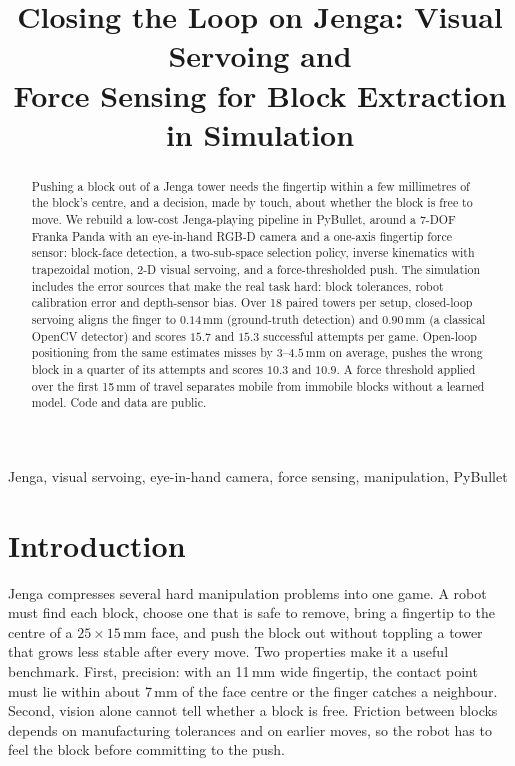 \documentclass[conference]{IEEEtran}
\begin{document}
\title{Closing the Loop on Jenga: Visual Servoing and\\Force Sensing for Block Extraction in Simulation}

\author{
}

\maketitle

\begin{abstract}
Pushing a block out of a Jenga tower needs the fingertip within a few millimetres
of the block's centre, and a decision, made by touch, about whether the block is
free to move. We rebuild a low-cost Jenga-playing pipeline in PyBullet, around a
7-DOF Franka Panda with an eye-in-hand RGB-D camera and a one-axis fingertip force
sensor: block-face detection, a two-sub-space selection policy, inverse kinematics
with trapezoidal motion, 2\textonehalf-D visual servoing, and a force-thresholded
push. The simulation includes the error sources that make the real task hard:
block tolerances, robot calibration error and depth-sensor bias. Over 18 paired
towers per setup, closed-loop servoing aligns the finger to $0.14$\,mm (ground-truth
detection) and $0.90$\,mm (a classical OpenCV detector) and scores $15.7$ and $15.3$
successful attempts per game. Open-loop positioning from the same estimates misses by
$3$--$4.5$\,mm on average, pushes the wrong block in a quarter of its attempts and scores
$10.3$ and $10.9$. A force threshold applied over the first 15\,mm of travel separates
mobile from immobile blocks without a learned model. Code and data are public.
\end{abstract}

\begin{IEEEkeywords}
Jenga, visual servoing, eye-in-hand camera, force sensing, manipulation, PyBullet
\end{IEEEkeywords}

\section{Introduction}

Jenga compresses several hard manipulation problems into one game. A robot must
find each block, choose one that is safe to remove, bring a fingertip to the
centre of a $25\times15$\,mm face, and push the block out without toppling a
tower that grows less stable after every move. Two properties make it a useful
benchmark. First, precision: with an 11\,mm wide fingertip, the contact point must
lie within about 7\,mm of the face centre or the finger catches a neighbour. Second,
vision alone cannot tell whether a block is free. Friction between blocks depends on
manufacturing tolerances and on earlier moves, so the robot has to feel the block
before committing to the push.
\end{document}
